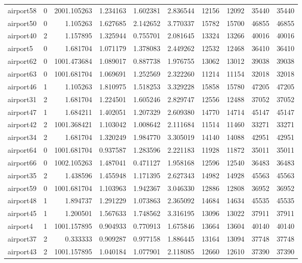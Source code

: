 \begin{longtable}{|l|r|r|r|r|r|r|r|r|r|}
airport58 & 0 & 2001.105263 & 1.234163 & 1.602381 & 2.836544 & 12156 & 12092 & 35440 & 35440 \\
airport50 & 0 & 1.105263 & 1.627685 & 2.142652 & 3.770337 & 15782 & 15700 & 46855 & 46855 \\
airport40 & 2 & 1.157895 & 1.325944 & 0.755701 & 2.081645 & 13324 & 13266 & 40016 & 40016 \\
airport5 & 0 & 1.681704 & 1.071179 & 1.378083 & 2.449262 & 12532 & 12468 & 36410 & 36410 \\
airport62 & 0 & 1001.473684 & 1.089017 & 0.887738 & 1.976755 & 13062 & 13012 & 39038 & 39038 \\
airport63 & 0 & 1001.681704 & 1.069691 & 1.252569 & 2.322260 & 11214 & 11154 & 32018 & 32018 \\
airport46 & 1 & 1.105263 & 1.810975 & 1.518253 & 3.329228 & 15858 & 15780 & 47205 & 47205 \\
airport31 & 2 & 1.681704 & 1.224501 & 1.605246 & 2.829747 & 12556 & 12488 & 37052 & 37052 \\
airport47 & 1 & 1.684211 & 1.402051 & 1.207329 & 2.609380 & 14770 & 14714 & 45147 & 45147 \\
airport42 & 2 & 1001.368421 & 1.103042 & 1.008642 & 2.111684 & 11514 & 11460 & 33271 & 33271 \\
airport34 & 2 & 1.681704 & 1.320249 & 1.984770 & 3.305019 & 14140 & 14088 & 42951 & 42951 \\
airport64 & 0 & 1001.681704 & 0.937587 & 1.283596 & 2.221183 & 11928 & 11872 & 35011 & 35011 \\
airport66 & 0 & 1002.105263 & 1.487041 & 0.471127 & 1.958168 & 12596 & 12540 & 36483 & 36483 \\
airport35 & 2 & 1.438596 & 1.455948 & 1.171395 & 2.627343 & 14982 & 14928 & 45563 & 45563 \\
airport59 & 0 & 1001.681704 & 1.103963 & 1.942367 & 3.046330 & 12886 & 12808 & 36952 & 36952 \\
airport48 & 1 & 1.894737 & 1.291229 & 1.073863 & 2.365092 & 14684 & 14634 & 45535 & 45535 \\
airport45 & 1 & 1.200501 & 1.567633 & 1.748562 & 3.316195 & 13096 & 13022 & 37911 & 37911 \\
airport4 & 1 & 1001.157895 & 0.904933 & 0.770913 & 1.675846 & 13664 & 13604 & 40140 & 40140 \\
airport37 & 2 & 0.333333 & 0.909287 & 0.977158 & 1.886445 & 13164 & 13094 & 37748 & 37748 \\
airport43 & 2 & 1001.157895 & 1.040184 & 1.077901 & 2.118085 & 12660 & 12610 & 37390 & 37390 \\

\end{longtable}
